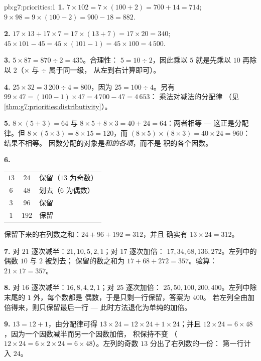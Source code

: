 \begin{solution}{pb:g7:priorities:1}
\textbf{1.} $7 \times 102 = 7 \times (100 + 2) = 700 + 14 =
714$; \quad $9 \times 98 = 9 \times (100 - 2) = 900 - 18 = 882$.

\textbf{2.} $17 \times 13 + 17 \times 7 = 17 \times (13 + 7) =
17 \times 20 = 340$; \quad $45 \times 101 - 45 = 45 \times (101
- 1) = 45 \times 100 = 4\,500$.

\textbf{3.} $5 \times 87 = 870 \div 2 = 435$。合理性：
$5 = 10 \div 2$，因此乘以 $5$ 就是先乘以 $10$
再除以 $2$（$\times$ 与 $\div$ 属于同一级，
从左到右计算即可）。

\textbf{4.} $25 \times 32 = 3\,200 \div 4 = 800$，因为
$25 = 100 \div 4$。另有
$99 \times 47 = (100 - 1) \times 47 = 4\,700 - 47 = 4\,653$：
乘法对减法的分配律
（见\cref{thm:g7:priorities:distributivity}）。

\textbf{5.} $8 \times (5 + 3) = 64$ 与 $8 \times 5 + 8 \times 3
= 40 + 24 = 64$：两者相等 --- 这正是分配律。但
$8 \times (5 \times 3) = 8 \times 15 = 120$，而
$(8 \times 5) \times (8 \times 3) = 40 \times 24 = 960$：结果不相等。
因数分配的对象是\emph{和的各项}，而不是
积的各个因数。

\textbf{6.}
\begin{center}
\renewcommand{\arraystretch}{1.15}
\begin{tabular}{ccl}
$13$ & $24$ & 保留（$13$ 为奇数） \\
$6$ & $48$ & 划去（$6$ 为偶数） \\
$3$ & $96$ & 保留 \\
$1$ & $192$ & 保留 \\
\end{tabular}
\end{center}
保留下来的右列数之和：$24 + 96 + 192 = 312$，并且
确实有 $13 \times 24 = 312$。

\textbf{7.} 对 $21$ 逐次减半：$21, 10, 5, 2, 1$；对 $17$ 逐次加倍：
$17, 34, 68, 136, 272$。左列中的偶数 $10$ 与 $2$ 被划去；
保留的数之和为 $17 + 68 + 272 = 357$。验算：
$21 \times 17 = 357$。

\textbf{8.} 对 $16$ 逐次减半：$16, 8, 4, 2, 1$；对 $25$ 逐次加倍：
$25, 50, 100, 200, 400$。左列中除末尾的 $1$ 外，每个数都是
偶数，于是只剩一行保留，答案为 $400$。
若左列全由加倍得来，则只保留最后一行 ---
此时方法退化为单纯的加倍。

\textbf{9.} $13 = 12 + 1$，由分配律可得
$13 \times 24 = 12 \times 24 + 1 \times 24$；并且
$12 \times 24 = 6 \times 48$，因为一个因数减半而另一个因数加倍，
积保持不变
（$12 \times 24 = 6 \times 2 \times 24 = 6 \times 48$）。左列的奇数
$13$ 分出了右列数的一份：
第一行计入 $24$。


\end{solution}
